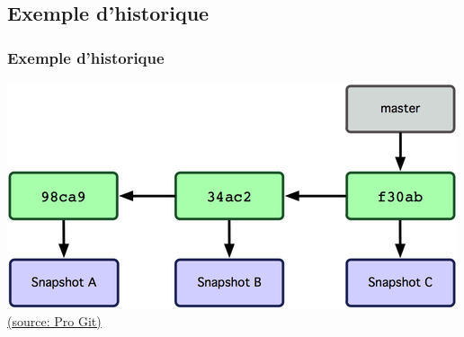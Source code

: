 \documentclass[t,11pt]{beamer}
\begin{document}
\subsection{Exemple d'historique}
\begin{frame}[c]
        \frametitle{Exemple d'historique}
        \includegraphics[width=\linewidth]{./img/master_branch}
        \newline
        \hspace*{15pt}
        \href{https://git-scm.com/book/fr/v1/Les-branches-avec-Git-Ce-qu-est-une-branche}{{\tiny (source: Pro Git)}}
\end{frame}
\end{document}
